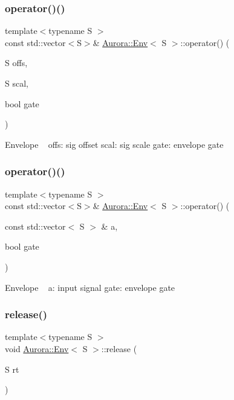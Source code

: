 \subsubsection{\texorpdfstring{operator()()}{operator()()}\hspace{0.1cm}{\footnotesize\ttfamily [2/3]}}
{\footnotesize\ttfamily template$<$typename S $>$ \\
const std\+::vector$<$S$>$\& \hyperlink{class_aurora_1_1_env}{Aurora\+::\+Env}$<$ S $>$\+::operator() (\begin{DoxyParamCaption}\item[{S}]{offs,  }\item[{S}]{scal,  }\item[{bool}]{gate }\end{DoxyParamCaption})\hspace{0.3cm}{\ttfamily [inline]}}

Envelope ~\newline
offs\+: sig offset scal\+: sig scale gate\+: envelope gate \mbox{\label{class_aurora_1_1_env_a2a97a7e7211a8717957fd0f6f8afc81f}} 
\subsubsection{\texorpdfstring{operator()()}{operator()()}\hspace{0.1cm}{\footnotesize\ttfamily [3/3]}}
{\footnotesize\ttfamily template$<$typename S $>$ \\
const std\+::vector$<$S$>$\& \hyperlink{class_aurora_1_1_env}{Aurora\+::\+Env}$<$ S $>$\+::operator() (\begin{DoxyParamCaption}\item[{const std\+::vector$<$ S $>$ \&}]{a,  }\item[{bool}]{gate }\end{DoxyParamCaption})\hspace{0.3cm}{\ttfamily [inline]}}

Envelope ~\newline
a\+: input signal gate\+: envelope gate \mbox{\label{class_aurora_1_1_env_a6591658018e04100709018bc86e94f31}} 
\subsubsection{\texorpdfstring{release()}{release()}}
{\footnotesize\ttfamily template$<$typename S $>$ \\
void \hyperlink{class_aurora_1_1_env}{Aurora\+::\+Env}$<$ S $>$\+::release (\begin{DoxyParamCaption}\item[{S}]{rt }\end{DoxyParamCaption})\hspace{0.3cm}{\ttfamily [inline]}}

